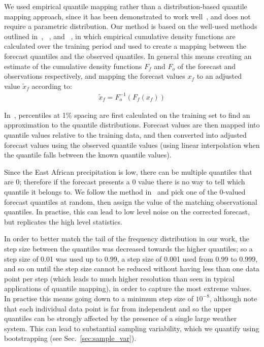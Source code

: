 \documentclass{article}
\begin{document}
We used empirical quantile mapping rather than a distribution-based quantile mapping approach, since it has been demonstrated to work well~\citep{gudmundsson_quantile_2012}, and does not require a parametric distribution. Our method is based on the well-used methods outlined in~\cite{boe_statistical_2007}, ~\citet{deque_frequency_2007}, and ~\citet{maraun_model_2017}, in which empirical cumulative density functions are calculated over the training period and used to create a mapping between the forecast quantiles and the observed quantiles. In general this means creating an estimate of the cumulative density functions $F_{f}$ and $F_{o}$ of the forecast and observations respectively, and mapping the forecast values $x_{f}$ to an adjusted value $\tilde{x}_f$ according to:
\begin{align}
    \tilde{x}_f = F^{-1}_o (F_f (x_f))
\end{align}

In~\cite{boe_statistical_2007}, percentiles at 1\% spacing are first calculated on the training set to find an approximation to the quantile distributions. Forecast values are then mapped into quantile values relative to the training data, and then converted into adjusted forecast values using the observed quantile values (using linear interpolation when the quantile falls between the known quantile values). 

Since the East African precipitation is low, there can be multiple quantiles that are 0; therefore if the forecast presents a 0 value there is no way to tell which quantile it belongs to. We follow the method in~\cite{boe_statistical_2007} and pick one of the 0-valued forecast quantiles at random, then assign the value of the matching observational quantiles. In practise, this can lead to low level noise on the corrected forecast, but replicates the high level statistics.

In order to better match the tail of the frequency distribution in our work, the step size between the quantiles was decreased towards the higher quantiles; so a step size of 0.01 was used up to 0.99, a step size of 0.001 used from 0.99 to 0.999, and so on until the step size cannot be reduced without having less than one data point per step (which leads to much higher resolution than seen in typical applications of quantile mapping), in order to capture the most extreme values. In practise this means going down to a minimum step size of $10^{-8}$, although note that each individual data point is far from independent and so the upper quantiles can be strongly affected by the presence of a single large weather system. This can lead to substantial sampling variability, which we quantify using bootstrapping (see Sec.~\ref{sec:sample_var}).
\end{document}
